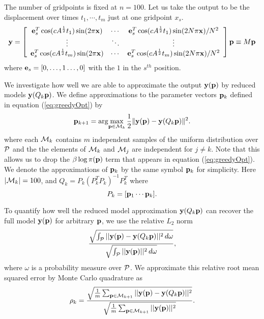 The number of gridpoints is fixed at $n=100$. Let us take the output to be the displacement over times $t_1,\cdots, t_m$ just at one gridpoint $x_s$. 
\begin{equation}
{\mathbf{y}}=\left[
\begin{array}{ccc}
{\mathbf{e}}_s^T \cos(cA^{\frac{1}{2}}t_1)\sin(2\pi {\mathbf{x}}) & \cdots & {\mathbf{e}}_s^T \cos(cA^{\frac{1}{2}}t_1)\sin(2N \pi {\mathbf{x}})/N^2 \\
\vdots & \ddots & \vdots \\
{\mathbf{e}}_s^T \cos(cA^{\frac{1}{2}}t_m)\sin(2\pi {\mathbf{x}}) & \cdots & {\mathbf{e}}_s^T \cos(cA^{\frac{1}{2}}t_m)\sin(2N \pi {\mathbf{x}})/N^2
\end{array}
\right]{\mathbf{p}} \equiv M {\mathbf{p}}
\end{equation}
where ${\mathbf{e}}_s=[0,\dots,1\dots,0]$ with the $1$ in the $s^{th}$ position. 

We investigate how well we are able to approximate the output ${\mathbf{y}}({\mathbf{p}})$ by reduced models ${\mathbf{y}}(Q_k {\mathbf{p}})$. %
%
We define approximations to the parameter vectors ${\mathbf{p}}_k$ defined in equation (\ref{eq:greedyOpt}) by
\begin{equation}
{\mathbf{p}}_{k+1} = \arg\!\max_{{\mathbf{p}}\in \mathcal{M}_k }\frac{1}{2}\|{\mathbf{y}}({\mathbf{p}})-{\mathbf{y}}(Q_k {\mathbf{p}})\|^2 .
\end{equation}
where each $\mathcal{M}_k$ contains $m$ independent samples of the uniform distribution over $\mathcal{P}$ and the the elements of $\mathcal{M}_k$ and $\mathcal{M}_j$ are independent for $j\neq k$.  Note that this allows us to drop the $\beta \log \pi({\mathbf{p}})$ term that appears in equation (\ref{eq:greedyOpt}). We denote the approximations of ${\mathbf{p}}_k$ by the same symbol ${\mathbf{p}}_k$ for simplicity. Here $ |\mathcal{M}_k| = 100$, and $Q_k = P_k (P_k^T P_k)^{-1} P_k^T$ where 
\[ P_k = [ {\mathbf{p}}_1 \cdots {\mathbf{p}}_k ]. \] 

To quantify how well the reduced model approximation $\mathbf{y}(Q_k\mathbf{p})$ can recover the full model $\mathbf{y}(\mathbf{p})$ for arbitrary $\mathbf{p}$, we use the relative $L_2$ norm 
$$\frac{\sqrt{\int_{\mathcal{P}} ||\mathbf{y}(\mathbf{p})-\mathbf{y}(Q_k\mathbf{p})||^2\, d\omega}}{\sqrt{\int_{\mathcal{P}} ||\mathbf{y}(\mathbf{p})||^2\, d\omega}},$$ 
where $\omega$ is a probability measure over $\mathcal{P}$.
We approximate this relative root mean squared error by Monte Carlo quadrature as
\begin{equation}\label{eq:MCrmse}
\rho_k = \frac{\sqrt{\frac{1}{m} \sum_{\mathbf{p}\in \mathcal{M}_{k+1}} ||\mathbf{y}(\mathbf{p})-\mathbf{y}(Q_k\mathbf{p})||^2}}{\sqrt{\frac{1}{m} \sum_{\mathbf{p}\in \mathcal{M}_{k+1}} ||\mathbf{y}(\mathbf{p})||^2}}.
\end{equation}

